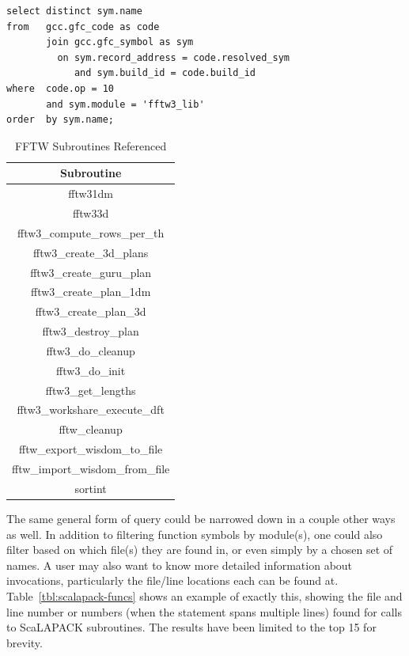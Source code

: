 \begin{lstlisting}[caption=Querying for Use of Library Functions, label=lst:fftw]
select distinct sym.name
from   gcc.gfc_code as code
       join gcc.gfc_symbol as sym
         on sym.record_address = code.resolved_sym
            and sym.build_id = code.build_id
where  code.op = 10
       and sym.module = 'fftw3_lib'
order  by sym.name;
\end{lstlisting}

\begin{table}[htbp]
\caption{FFTW Subroutines Referenced}
\begin{center}
\begin{tabular}{|c|}
\hline
\textbf{Subroutine} \\
\hline
fftw31dm \\
\hline
fftw33d \\
\hline
fftw3\_compute\_rows\_per\_th \\
\hline
fftw3\_create\_3d\_plans \\
\hline
fftw3\_create\_guru\_plan \\
\hline
fftw3\_create\_plan\_1dm \\
\hline
fftw3\_create\_plan\_3d \\
\hline
fftw3\_destroy\_plan \\
\hline
fftw3\_do\_cleanup \\
\hline
fftw3\_do\_init \\
\hline
fftw3\_get\_lengths \\
\hline
fftw3\_workshare\_execute\_dft \\
\hline
fftw\_cleanup \\
\hline
fftw\_export\_wisdom\_to\_file \\
\hline
fftw\_import\_wisdom\_from\_file \\
\hline
sortint \\
\hline
\end{tabular}
\label{tab:fftw-funcs}
\end{center}
\end{table}

The same general form of query could be narrowed down in a couple other ways as well.
In addition to filtering function symbols by module(s), one could also filter based on which file(s) they are found in, or even simply by a chosen set of names.
A user may also want to know more detailed information about invocations, particularly the file/line locations each can be found at.
Table~\ref{tbl:scalapack-funcs} shows an example of exactly this, showing the file and line number or numbers (when the statement spans multiple lines) found for calls to ScaLAPACK subroutines.
The results have been limited to the top 15 for brevity.

